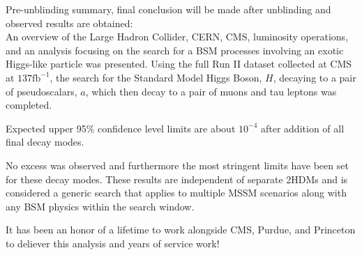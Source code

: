Pre-unblinding summary, final conclusion will be made after unblinding and observed results are obtained: \\



An overview of the Large Hadron Collider, CERN, CMS, luminosity operations, and an analysis focusing on the search for a BSM processes involving an exotic Higgs-like particle was presented.
Using the full Run II dataset collected at CMS at $\text{137}\text{fb}^{-1}$, the search for the Standard Model Higgs Boson, $H$, decaying to a pair of pseudoscalars, $a$, which then decay to a pair of muons and tau leptons was completed. 

Expected upper 95\% confidence level limits are about $10^{-4}$ after addition of all final decay modes. 


No excess was observed and furthermore the most stringent limits have been set for these decay modes. These results are independent of separate 2HDMs and is considered a generic search that applies to multiple MSSM scenarios along with any BSM physics within the search window. 

It has been an honor of a lifetime to work alongside CMS, Purdue, and Princeton to deliever this analysis and years of service work! 

